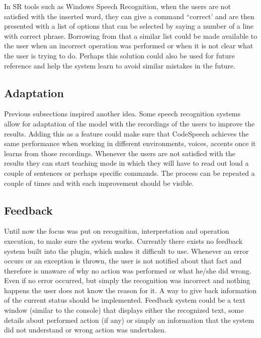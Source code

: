 In SR tools such as Windows Speech Recognition, when the users are not satisfied with the inserted word, they can give a command ``correct' and are then presented with a list of options that can be selected by saying a number of a line with correct phrase. Borrowing from that a similar list could be made available to the user when an incorrect operation was performed or when it is not clear what the user is trying to do. Perhaps this solution could also be used for future reference and help the system learn to avoid similar mistakes in the future. 

\subsection{Adaptation}
Previous subsections inspired another idea. Some speech recognition systems allow for adaptation of the model with the recordings of the users to improve the results. Adding this as a feature could make sure that CodeSpeech achieves the same performance when working in different environments, voices, accents once it learns from those recordings. Whenever the users are not satisfied with the results they can start teaching mode in which they will have to read out loud a couple of sentences or perhaps specific commands. The process can be repeated a couple of times and with each improvement should be visible.

\subsection{Feedback}
Until now the focus was put on recognition, interpretation and operation execution, to make sure the system works. Currently there exists no feedback system built into the plugin, which makes it difficult to use. Whenever an error occurs or an exception is thrown, the user is not notified about that fact and therefore is unaware of why no action was performed or what he/she did wrong. Even if no error occurred, but simply the recognition was incorrect and nothing happens the user does not know the reason for it. A way to give back information of the current status should be implemented. Feedback system could be a text window (similar to the console) that displays either the recognized text, some details about performed action (if any) or simply an information that the system did not understand or wrong action was undertaken. 

